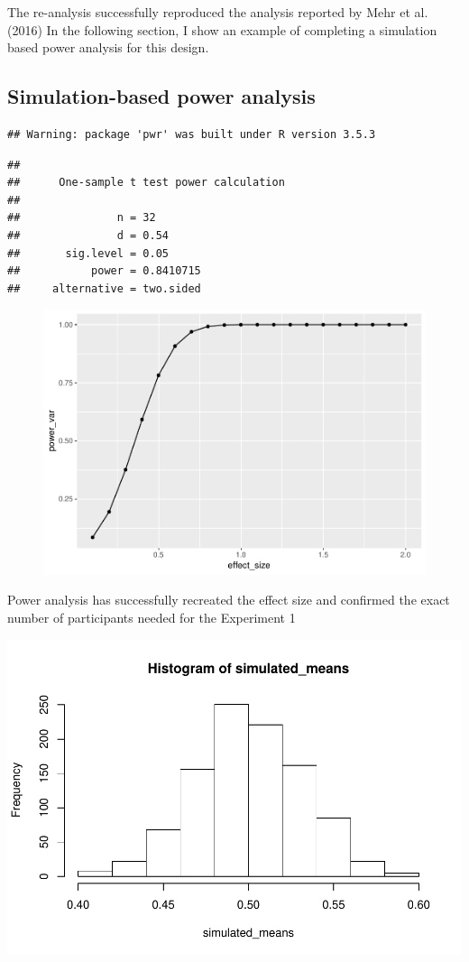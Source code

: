 \documentclass[man]{apa6}
\begin{document}
The re-analysis successfully reproduced the analysis reported by Mehr et
al. (2016) In the following section, I show an example of completing a
simulation based power analysis for this design.

\subsection{Simulation-based power
analysis}\label{simulation-based-power-analysis}

\begin{verbatim}
## Warning: package 'pwr' was built under R version 3.5.3
\end{verbatim}

\begin{verbatim}
## 
##      One-sample t test power calculation 
## 
##               n = 32
##               d = 0.54
##       sig.level = 0.05
##           power = 0.8410715
##     alternative = two.sided
\end{verbatim}

\begin{figure}
\centering
\includegraphics{Midterm_files/figure-latex/unnamed-chunk-9-1.pdf}
\caption{}
\end{figure}

Power analysis has successfully recreated the effect size and confirmed
the exact number of participants needed for the Experiment 1

\includegraphics{Midterm_files/figure-latex/unnamed-chunk-10-1.pdf}
\newpage
\end{document}
